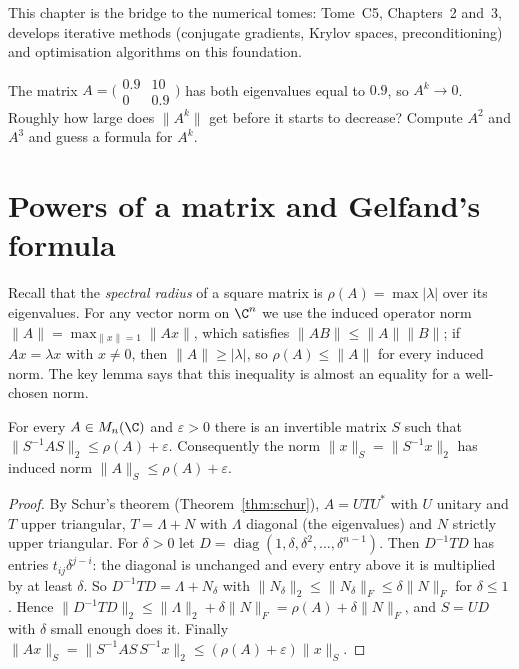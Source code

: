 This chapter is the bridge to the numerical tomes: Tome~C5, Chapters~2 and~3, develops iterative methods (conjugate gradients,
Krylov spaces, preconditioning) and optimisation algorithms on this foundation.

\begin{think}
The matrix $A=\bigl(\begin{smallmatrix}0.9&10\\0&0.9\end{smallmatrix}\bigr)$ has both eigenvalues equal to $0.9$, so $A^k\to0$. Roughly
how large does $\|A^k\|$ get before it starts to decrease? Compute $A^2$ and $A^3$ and guess a formula for $A^k$.
\end{think}

\section{Powers of a matrix and Gelfand's formula}

Recall that the \emph{spectral radius} of a square matrix is $\rho(A)=\max|\lambda|$ over its eigenvalues. For any vector norm on
$\C^n$ we use the induced operator norm $\|A\|=\max_{\|x\|=1}\|Ax\|$, which satisfies $\|AB\|\le\|A\|\|B\|$; if $Ax=\lambda x$ with
$x\ne0$, then $\|A\|\ge|\lambda|$, so $\rho(A)\le\|A\|$ for every induced norm. The key lemma says that this inequality is almost an
equality for a well-chosen norm.

\begin{lemma}\label{lem:adaptednorm}
For every $A\in M_n(\C)$ and $\varepsilon>0$ there is an invertible matrix $S$ such that $\|S^{-1}AS\|_2\le\rho(A)+\varepsilon$.
Consequently the norm $\|x\|_S=\|S^{-1}x\|_2$ has induced norm $\|A\|_S\le\rho(A)+\varepsilon$.
\end{lemma}
\begin{proof}
By Schur's theorem (Theorem~\ref{thm:schur}), $A=UTU^*$ with $U$ unitary and $T$ upper triangular, $T=\Lambda+N$ with
$\Lambda$ diagonal (the eigenvalues) and $N$ strictly upper triangular. For $\delta>0$ let $D=\operatorname{diag}(1,\delta,\delta^2,
\dots,\delta^{n-1})$. Then $D^{-1}TD$ has entries $t_{ij}\delta^{j-i}$: the diagonal is unchanged and every entry above it is
multiplied by at least $\delta$. So $D^{-1}TD=\Lambda+N_\delta$ with $\|N_\delta\|_2\le\|N_\delta\|_F\le\delta\|N\|_F$ for $\delta\le1$.
Hence $\|D^{-1}TD\|_2\le\|\Lambda\|_2+\delta\|N\|_F=\rho(A)+\delta\|N\|_F$, and $S=UD$ with $\delta$ small enough does it. Finally
$\|Ax\|_S=\|S^{-1}AS\,S^{-1}x\|_2\le(\rho(A)+\varepsilon)\|x\|_S$.
\end{proof}

